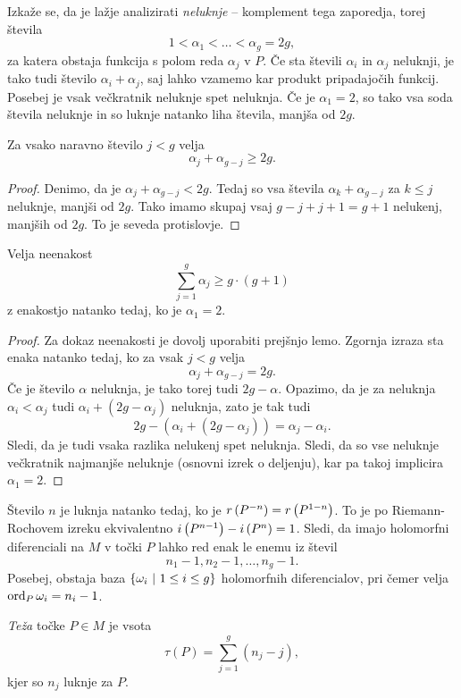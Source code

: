Izkaže se, da je lažje analizirati \emph{neluknje} -- komplement
tega zaporedja, torej števila
\[
1 < \alpha_1 < \dots < \alpha_g = 2g,
\]
za katera obstaja funkcija s polom reda $\alpha_j$ v $P$. Če sta
števili $\alpha_i$ in $\alpha_j$ neluknji, je tako tudi število
$\alpha_i + \alpha_j$, saj lahko vzamemo kar produkt pripadajočih
funkcij. Posebej je vsak večkratnik neluknje spet neluknja. Če je
$\alpha_1 = 2$, so tako vsa soda števila neluknje in so luknje
natanko liha števila, manjša od $2g$.

\begin{lema}
Za vsako naravno število $j < g$ velja
\[
\alpha_j + \alpha_{g-j} \geq 2g.
\]
\end{lema}

\begin{proof}
Denimo, da je $\alpha_j + \alpha_{g-j} < 2g$. Tedaj so vsa števila
$\alpha_k + \alpha_{g-j}$ za $k \leq j$ neluknje, manjši od $2g$.
Tako imamo skupaj vsaj $g-j + j + 1 = g+1$ nelukenj, manjših od
$2g$. To je seveda protislovje.
\end{proof}

\begin{lema}
Velja neenakost
\[
\sum_{j=1}^{g} \alpha_j \geq g \cdot(g+1)
\]
z enakostjo natanko tedaj, ko je $\alpha_1 = 2$.
\end{lema}

\begin{proof}
Za dokaz neenakosti je dovolj uporabiti prejšnjo lemo. Zgornja
izraza sta enaka natanko tedaj, ko za vsak $j < g$ velja
\[
\alpha_j + \alpha_{g-j} = 2g.
\]
Če je število $\alpha$ neluknja, je tako torej tudi $2g - \alpha$.
Opazimo, da je za neluknja $\alpha_i < \alpha_j$ tudi
$\alpha_i + (2g - \alpha_j)$ neluknja, zato je tak tudi
\[
2g - (\alpha_i + (2g - \alpha_j)) = \alpha_j - \alpha_i.
\]
Sledi, da je tudi vsaka razlika nelukenj spet neluknja. Sledi, da
so vse neluknje večkratnik najmanjše neluknje (osnovni izrek o
deljenju), kar pa takoj implicira $\alpha_1 = 2$.
\end{proof}

Število $n$ je luknja natanko tedaj, ko je
$r \left(P^{-n}\right) = r \left(P^{1-n}\right)$. To je po Riemann-Rochovem izreku
ekvivalentno $i \left(P^{n-1}\right) - i \left(P^n\right) = 1$. Sledi, da imajo
holomorfni diferenciali na $M$ v točki $P$ lahko red enak le enemu
iz števil
\[
n_1 - 1, n_2 - 1, \dots, n_g - 1.
\]
Posebej, obstaja baza $\left\{\omega_i~\middle\vert~1 \leq i \leq g\right\}$
holomorfnih diferencialov, pri čemer velja
$\operatorname{ord}_P \omega_i = n_i - 1$.

\begin{definicija}
\emph{Teža} točke $P \in M$ je vsota
\[
\tau(P) = \sum_{j=1}^g (n_j - j),
\]
kjer so $n_j$ luknje za $P$.
\end{definicija}


